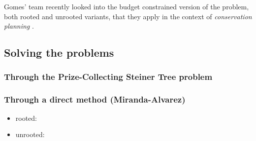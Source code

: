 		Gomes' team recently looked into the budget constrained version of the problem, both rooted and unrooted variants, that they apply in the context of \emph{conservation planning} \parencites{conrad2007connections}{gomes2008connections}{dilkina2010solving}.

	\subsection{Solving the \mwcs{} problems}
	\label{subsec:solvingmwcs}

	\subsubsection{Through the Prize-Collecting Steiner Tree problem}

	\subsubsection{Through a direct method (Miranda-Alvarez)}

		\begin{itemize}
			\item rooted: \cite{alvarez2013rooted}
			\item unrooted: \cite{alvarez2013maximum}
		\end{itemize}
